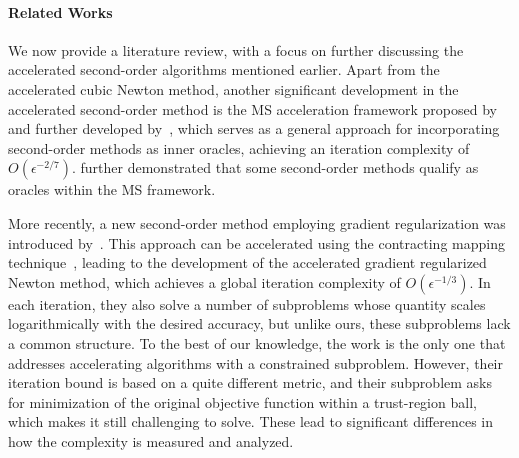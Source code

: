 \documentclass{article}
\theoremstyle{plain}
\theoremstyle{definition}
\theoremstyle{remark}
\newcommand{\cz}[1]{{\color{rr} #1}}
\begin{document}
\paragraph{Related Works}
We now provide a literature review, with a focus on further discussing the accelerated second-order algorithms mentioned earlier. Apart from the accelerated cubic Newton method, another significant development in the accelerated second-order method is the MS acceleration framework proposed by~\cite{monteiro2013accelerated} and further developed by~\citet{NEURIPS2022_e56f394b,carmon2022optimal}, which serves as a general approach for incorporating second-order methods as inner oracles, achieving an iteration complexity of $O(\epsilon^{-2/7})$. \citet{carmon2022optimal} further demonstrated that some second-order methods qualify as oracles within the MS framework.

More recently, a new second-order method employing gradient regularization was introduced by~\citet{mishchenko_regularized_2023}. This approach can be accelerated using the contracting mapping technique~\cite{doikov2020contracting}, leading to the development of the accelerated gradient regularized Newton method, which achieves a global iteration complexity of $O(\epsilon^{-1/3})$. In each iteration, they also solve a number of subproblems whose quantity scales logarithmically with the desired accuracy, but unlike ours, these subproblems lack a common structure. To the best of our knowledge, the work \cite{carmon2020acceleration} is the only one that addresses accelerating algorithms with a constrained subproblem. However, their iteration bound is based on a quite different metric, and their subproblem asks for minimization of the original objective function within a trust-region ball, which makes it still challenging to solve. These lead to significant differences in how the complexity is measured and analyzed.

\end{document}
